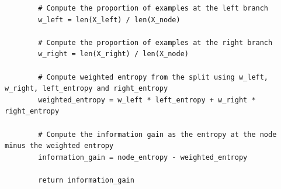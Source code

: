 \begin{lstlisting}
	    # Compute the proportion of examples at the left branch
	    w_left = len(X_left) / len(X_node)
	
	    # Compute the proportion of examples at the right branch
	    w_right = len(X_right) / len(X_node)
	
	    # Compute weighted entropy from the split using w_left, w_right, left_entropy and right_entropy
	    weighted_entropy = w_left * left_entropy + w_right * right_entropy
	
	    # Compute the information gain as the entropy at the node minus the weighted entropy
	    information_gain = node_entropy - weighted_entropy
	
	    return information_gain
\end{lstlisting}

